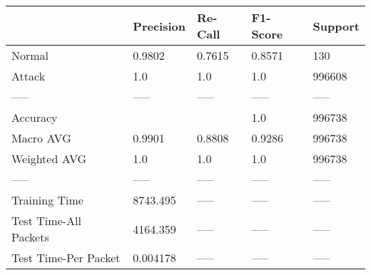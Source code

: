 \begin{tabular}{lllll}
\toprule
{} & Precision & Re-Call & F1-Score & Support \\
\midrule
Normal                &    0.9802 &  0.7615 &   0.8571 &     130 \\
Attack                &       1.0 &     1.0 &      1.0 &  996608 \\
-----                 &     ----- &   ----- &    ----- &   ----- \\
Accuracy              &           &         &      1.0 &  996738 \\
Macro AVG             &    0.9901 &  0.8808 &   0.9286 &  996738 \\
Weighted AVG          &       1.0 &     1.0 &      1.0 &  996738 \\
-----                 &     ----- &   ----- &    ----- &   ----- \\
Training Time         &  8743.495 &   ----- &    ----- &   ----- \\
Test Time-All Packets &  4164.359 &   ----- &    ----- &   ----- \\
Test Time-Per Packet  &  0.004178 &   ----- &    ----- &   ----- \\
\bottomrule
\end{tabular}
